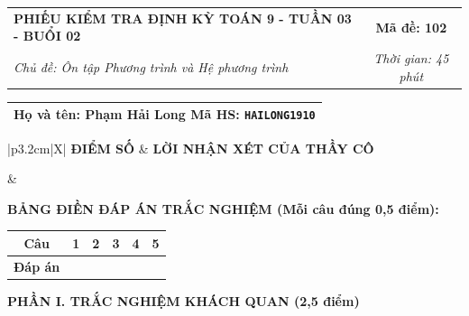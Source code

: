 \documentclass[12pt,a4paper]{article}
\begin{document}
\newpage


\noindent
\begin{tabularx}{\linewidth}{|X|c|}
\hline
\textbf{PHIẾU KIỂM TRA ĐỊNH KỲ TOÁN 9 - TUẦN 03 - BUỔI 02} & \textbf{Mã đề: 102} \\
\textit{Chủ đề: Ôn tập Phương trình và Hệ phương trình} & \textit{Thời gian: 45 phút} \\
\hline
\end{tabularx}

\vspace{1mm}

\noindent
\begin{tabularx}{\linewidth}{|X|}
\hline
\rule[-2mm]{0pt}{7.5mm}\textbf{Họ và tên:} \textbf{\large Phạm Hải Long} \hfill \textbf{Mã HS:} \texttt{HAILONG1910} \quad \\
\hline
\end{tabularx}

\vspace{1mm}

\noindent
\begin{tabularx}{\linewidth}{|p{3.2cm}|X|}
\hline
\centering\textbf{ĐIỂM SỐ} & \centering\textbf{LỜI NHẬN XÉT CỦA THẦY CÔ} \tabularnewline
\hline
\rule{0pt}{1.3cm} & \tabularnewline
\hline
\end{tabularx}

\vspace{1.2mm}

\noindent\textbf{BẢNG ĐIỀN ĐÁP ÁN TRẮC NGHIỆM (Mỗi câu đúng 0,5 điểm):}
\vspace{0.8mm}

\noindent
\renewcommand{\arraystretch}{1.35}
\begin{tabularx}{\linewidth}{|c|*{5}{>{\centering\arraybackslash}X|}}
\hline
\textbf{Câu} & \textbf{1} & \textbf{2} & \textbf{3} & \textbf{4} & \textbf{5} \\
\hline
\textbf{Đáp án} & & & & & \\
\hline
\end{tabularx}
\renewcommand{\arraystretch}{1.0}

\vspace{1.5mm}

\noindent\textbf{\large PHẦN I. TRẮC NGHIỆM KHÁCH QUAN (2,5 điểm)}
\vspace{1mm}
\end{document}
